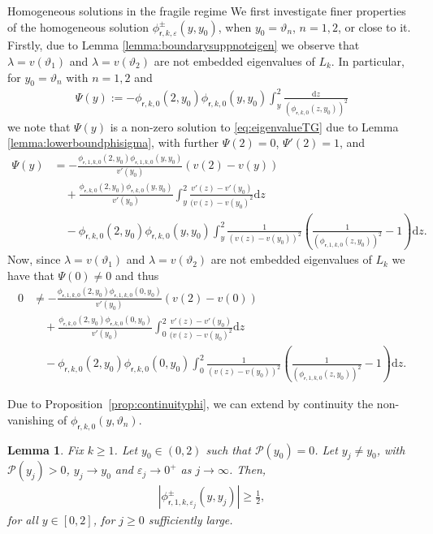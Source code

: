 \documentclass[11pt,reqno]{amsproc}
\makeatletter
\renewcommand\subsection{\@startsection{subsection}{2}%
\normalparindent{.5\linespacing\@plus.7\linespacing}{-.5em}
{\normalfont\bfseries}}
\newtheorem{lemma}[proposition]{Lemma}
\theoremstyle{definition}
\numberwithin{equation}{section}
\newcommand{\sr}{{\mathsf{r}}}
\renewcommand{\d}{\mathrm{d}}
\newcommand{\ep}{\varepsilon}
\renewcommand{\P}{{\mathcal{P}}}
\makeatother
\begin{document}
\subsection{Homogeneous solutions in the fragile regime}
We first investigate finer properties of the homogeneous solution $\phi_{\sr,k,\ep}^\pm(y,y_0)$, when $y_0=\vartheta_n$, $n=1,2$, or close to it. Firstly, due to Lemma \ref{lemma:boundarysuppnoteigen} we observe that $\lambda=v(\vartheta_1)$ and $\lambda=v(\vartheta_2)$ are not embedded eigenvalues of $L_k$. In particular, for $y_0=\vartheta_n$ with $n=1,2$ and
\begin{align*}
    \Psi(y) := -\phi_{\sr,k,0}(2,y_0)\phi_{\sr,k,0}(y,y_0)\int_y^2 \frac{\d z}{(\phi_{\sr,k,0}(z,y_0))^2}
\end{align*}
we note that $\Psi(y)$ is a non-zero solution to \eqref{eq:eigenvalueTG} due to Lemma \ref{lemma:lowerboundphisigma}, with further $\Psi(2)=0$, $\Psi'(2)=1$, and 
\begin{align*}
    \Psi(y) &= - \frac{\phi_{\sr,1,k,0}(2,y_0)\phi_{\sr,1,k,0}(y,y_0)}{v'(y_0)}(v(2) - v(y)) \\
    &\quad+ \frac{\phi_{\sr,k,0}(2,y_0)\phi_{\sr,k,0}(y,y_0)}{v'(y_0)}\int_y^2 \frac{v'(z) - v'(y_0)}{(v(z) - v(y_0)^2} \d z \\
    &\quad - \phi_{\sr,k,0}(2,y_0)\phi_{\sr,k,0}(y,y_0)\int_{y}^2 \frac{1}{(v(z) - v(y_0))^2}\left( \frac{1}{(\phi_{\sr,1,k,0}(z,y_0))^2} -1 \right) \d z.
\end{align*}
Now, since  $\lambda=v(\vartheta_1)$ and $\lambda=v(\vartheta_2)$ are not embedded eigenvalues of $L_k$ we have that $\Psi(0)\neq 0$ and thus
\begin{equation}\label{eq:nonzeroWborder}
\begin{split}
    0 &\neq - \frac{\phi_{\sr,1,k,0}(2,y_0)\phi_{\sr,1,k,0}(0,y_0)}{v'(y_0)}(v(2) - v(0)) \\
    &\quad+ \frac{\phi_{\sr,k,0}(2,y_0)\phi_{\sr,k,0}(0,y_0)}{v'(y_0)}\int_0^2 \frac{v'(z) - v'(y_0)}{(v(z) - v(y_0)^2} \d z \\
    &\quad - \phi_{\sr,k,0}(2,y_0)\phi_{\sr,k,0}(0,y_0)\int_{0}^2 \frac{1}{(v(z) - v(y_0))^2}\left( \frac{1}{(\phi_{\sr,1,k,0}(z,y_0))^2} -1 \right) \d z.
    \end{split}
\end{equation}
 
Due to Proposition~\ref{prop:continuityphi}, we can extend by continuity the non-vanishing of $\phi_{\sr,k,0}(y,\vartheta_n)$.

\begin{lemma}\label{lemma:fragilephir1knonzero}
Fix $k\geq 1$. Let $y_0\in (0,2)$ such that $\P(y_0)=0$. Let $y_j\neq y_0$, with $\P(y_j)>0$, $y_j\rightarrow y_0$ and $\ep_j\rightarrow 0^+$ as $j\rightarrow \infty$. Then,
\begin{align*}
|\phi_{\sr,1,k,\ep_j}^\pm(y,y_j)|\geq \frac12,
\end{align*}
for all $y\in [0,2]$, for $j\geq 0$ sufficiently large.
\end{lemma}
\end{document}
